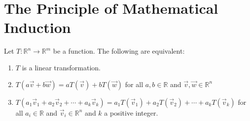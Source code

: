 \section{The Principle of Mathematical Induction}

\begin{theorem}
Let $T:\mathbb{R}^n\to\mathbb{R}^m$ be a function. The following are equivalent:
\begin{enumerate}
\item $T$ is a linear transformation.
\item $T(a\vec{v}+b\vec{w})=aT(\vec{v})+bT(\vec{w})$ for all $a,b \in \mathbb{R}$
and $\vec{v},\vec{w} \in \mathbb{R}^n$
\item $T(a_1\vec{v}_1+a_2\vec{v}_2+\cdots+a_k\vec{v}_k)=                                                                                                                
a_1T(\vec{v}_1)+a_2T(\vec{v}_2)+\cdots+a_kT(\vec{v}_k)$
for all $a_i \in \mathbb{R}$ and $\vec{v}_i \in \mathbb{R}^n$ and $k$ a positive integer.
\end{enumerate}
\end{theorem}



